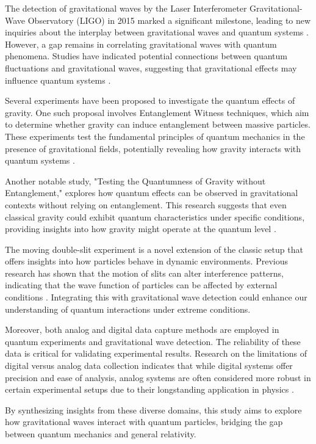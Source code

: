 \documentclass{article}
\begin{document}
The detection of gravitational waves by the Laser Interferometer Gravitational-Wave Observatory (LIGO) in 2015 marked a significant milestone, leading to new inquiries about the interplay between gravitational waves and quantum systems \cite{abbott2016}. However, a gap remains in correlating gravitational waves with quantum phenomena. Studies have indicated potential connections between quantum fluctuations and gravitational waves, suggesting that gravitational effects may influence quantum systems \cite{maldacena2013}.

Several experiments have been proposed to investigate the quantum effects of gravity. One such proposal involves Entanglement Witness techniques, which aim to determine whether gravity can induce entanglement between massive particles. These experiments test the fundamental principles of quantum mechanics in the presence of gravitational fields, potentially revealing how gravity interacts with quantum systems \cite{rangamani2017}.

Another notable study, "Testing the Quantumness of Gravity without Entanglement," explores how quantum effects can be observed in gravitational contexts without relying on entanglement. This research suggests that even classical gravity could exhibit quantum characteristics under specific conditions, providing insights into how gravity might operate at the quantum level \cite{oppenheim2021}.

The moving double-slit experiment is a novel extension of the classic setup that offers insights into how particles behave in dynamic environments. Previous research has shown that the motion of slits can alter interference patterns, indicating that the wave function of particles can be affected by external conditions \cite{scully1999}. Integrating this with gravitational wave detection could enhance our understanding of quantum interactions under extreme conditions.

Moreover, both analog and digital data capture methods are employed in quantum experiments and gravitational wave detection. The reliability of these data is critical for validating experimental results. Research on the limitations of digital versus analog data collection indicates that while digital systems offer precision and ease of analysis, analog systems are often considered more robust in certain experimental setups due to their longstanding application in physics \cite{klyshko1988}.

By synthesizing insights from these diverse domains, this study aims to explore how gravitational waves interact with quantum particles, bridging the gap between quantum mechanics and general relativity.
\end{document}
